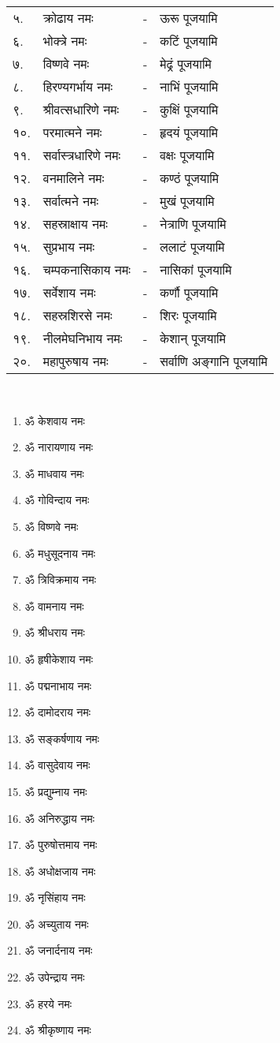 \begin{tabular}{llll}
५.&	क्रोढाय नमः &-& ऊरू पूजयामि	\\
६.&	भोक्त्रे नमः &-& कटिं पूजयामि	\\
७.&	विष्णवे नमः &-& मेढ्रं पूजयामि		\\
८.&	हिरण्यगर्भाय नमः &-& नाभिं पूजयामि\\
९.&	श्रीवत्सधारिणे नमः &-& कुक्षिं पूजयामि	\\
१०.& परमात्मने नमः &-& हृदयं पूजयामि\\
११.& सर्वास्त्रधारिणे नमः &-& वक्षः पूजयामि	\\
१२.& वनमालिने नमः &-& कण्ठं पूजयामि\\
१३.& सर्वात्मने नमः &-& मुखं पूजयामि	\\
१४.&	 सहस्राक्षाय नमः &-& नेत्राणि पूजयामि\\
१५.& सुप्रभाय नमः &-& ललाटं पूजयामि	\\
१६.& चम्पकनासिकाय नमः &-& नासिकां पूजयामि	\\
१७.& सर्वेशाय नमः &-& कर्णौ पूजयामि	\\
१८.& सहस्रशिरसे नमः &-& शिरः पूजयामि\\
१९.& नीलमेघनिभाय नमः &-& केशान् पूजयामि	\\
२०.& महापुरुषाय नमः &-& सर्वाणि अङ्गानि पूजयामि	\\
\end{tabular}

{}\mbox{}\\[-3.5em]
\begin{multicols}{2}
\begin{enumerate}
\item ॐ केशवाय नमः
\item ॐ नारायणाय नमः
\item ॐ माधवाय नमः
\item ॐ गोविन्दाय नमः
\item ॐ विष्णवे नमः	
\item ॐ मधुसूदनाय नमः
\item ॐ त्रिविक्रमाय नमः
\item ॐ वामनाय नमः
\item ॐ श्रीधराय नमः
\item ॐ हृषीकेशाय नमः
\item ॐ पद्मनाभाय नमः
\item ॐ दामोदराय नमः
\item ॐ सङ्कर्षणाय नमः
\item ॐ वासुदेवाय नमः
\item ॐ प्रद्युम्नाय नमः
\item ॐ अनिरुद्धाय नमः
\item ॐ पुरुषोत्तमाय नमः
\item ॐ अधोक्षजाय नमः
\item ॐ नृसिंहाय नमः
\item ॐ अच्युताय नमः
\item ॐ जनार्दनाय नमः
\item ॐ उपेन्द्राय नमः 
\item ॐ हरये नमः
\item ॐ श्रीकृष्णाय नमः
\end{enumerate}
\end{multicols}

